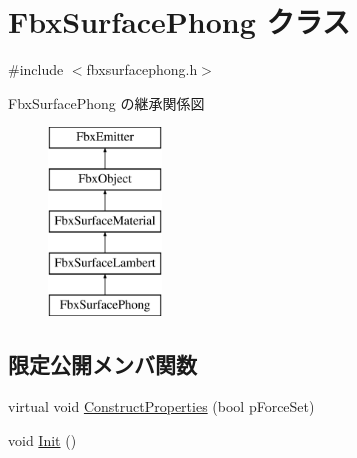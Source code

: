 \hypertarget{class_fbx_surface_phong}{}\section{Fbx\+Surface\+Phong クラス}
\label{class_fbx_surface_phong}


{\ttfamily \#include $<$fbxsurfacephong.\+h$>$}

Fbx\+Surface\+Phong の継承関係図\begin{figure}[H]
\begin{center}
\leavevmode
\includegraphics[height=5.000000cm]{class_fbx_surface_phong}
\end{center}
\end{figure}
\subsection*{限定公開メンバ関数}
\begin{DoxyCompactItemize}
\item 
virtual void \hyperlink{class_fbx_surface_phong_aa4262a042d35769e8ff745d408315bf9}{Construct\+Properties} (bool p\+Force\+Set)
\item 
void \hyperlink{class_fbx_surface_phong_af594d25056c03cd67396191c7d480098}{Init} ()
\end{DoxyCompactItemize}
